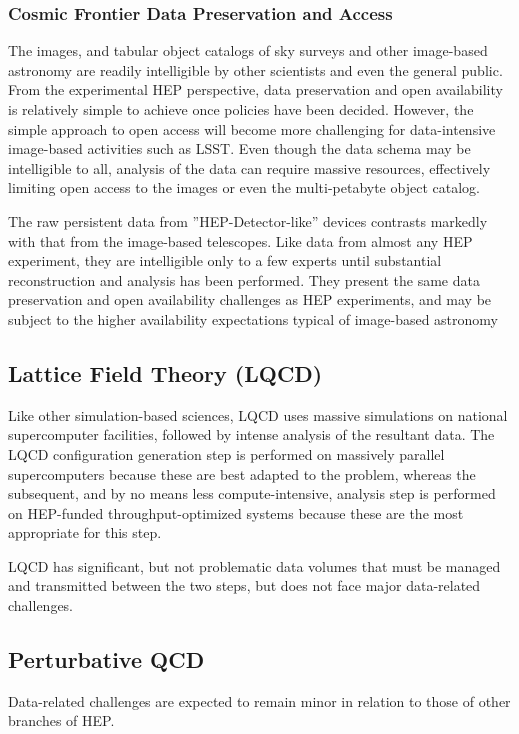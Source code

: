 \subsubsection{Cosmic Frontier Data Preservation and Access}

The images, and tabular object catalogs of sky surveys and other image-based astronomy 
are readily intelligible by other scientists and even the general public.  From the 
experimental HEP perspective, data preservation and open availability is relatively 
simple to achieve once policies have been decided.  However, the simple approach to open access will become more challenging for data-intensive image-based activities such as LSST.  Even though the data schema may be intelligible to all, analysis of the data can require massive resources, effectively limiting open access to the images or even the multi-petabyte object catalog.

The raw persistent data from ''HEP-Detector-like'' devices contrasts markedly with that from the 
image-based telescopes.  Like data from almost any HEP experiment, they are 
intelligible only to a few experts until substantial reconstruction and analysis 
has been performed.  They present the same data preservation and open availability 
challenges as HEP experiments, and may be subject to the higher availability 
expectations typical of image-based astronomy

\subsection{Lattice Field Theory (LQCD)}
Like other simulation-based sciences, LQCD uses massive simulations on national 
supercomputer facilities, followed by intense analysis of the resultant data.  The LQCD configuration generation step is performed on massively parallel supercomputers 
because these are best adapted to the problem, whereas the subsequent, and by no means less compute-intensive, analysis step is performed on HEP-funded 
throughput-optimized systems because these are the most appropriate for this step.

LQCD has significant, but not problematic data volumes that must be managed and transmitted 
between the two steps, but does not face major data-related challenges.

\subsection{Perturbative QCD}
Data-related challenges are expected to remain minor in relation to those of other branches of HEP.


